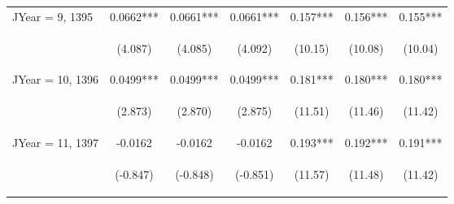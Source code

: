 \documentclass[]{article}
\begin{document}
\begin{center}
\begin{tabular}{lcccccc}
JYear = 9, 1395 & 0.0662*** & 0.0661*** & 0.0661*** & 0.157*** & 0.156*** & 0.155*** \\
\vspace{4pt} & \begin{footnotesize}(4.087)\end{footnotesize} & \begin{footnotesize}(4.085)\end{footnotesize} & \begin{footnotesize}(4.092)\end{footnotesize} & \begin{footnotesize}(10.15)\end{footnotesize} & \begin{footnotesize}(10.08)\end{footnotesize} & \begin{footnotesize}(10.04)\end{footnotesize} \\
JYear = 10, 1396 & 0.0499*** & 0.0499*** & 0.0499*** & 0.181*** & 0.180*** & 0.180*** \\
\vspace{4pt} & \begin{footnotesize}(2.873)\end{footnotesize} & \begin{footnotesize}(2.870)\end{footnotesize} & \begin{footnotesize}(2.875)\end{footnotesize} & \begin{footnotesize}(11.51)\end{footnotesize} & \begin{footnotesize}(11.46)\end{footnotesize} & \begin{footnotesize}(11.42)\end{footnotesize} \\
JYear = 11, 1397 & -0.0162 & -0.0162 & -0.0162 & 0.193*** & 0.192*** & 0.191*** \\
\vspace{4pt} & \begin{footnotesize}(-0.847)\end{footnotesize} & \begin{footnotesize}(-0.848)\end{footnotesize} & \begin{footnotesize}(-0.851)\end{footnotesize} & \begin{footnotesize}(11.57)\end{footnotesize} & \begin{footnotesize}(11.48)\end{footnotesize} & \begin{footnotesize}(11.42)\end{footnotesize} \\

\end{tabular}
\end{center}
\end{document}
